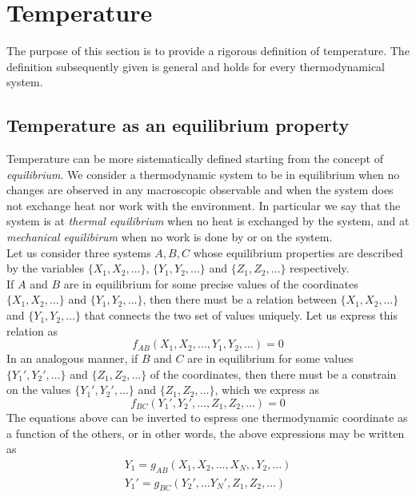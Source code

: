 \chapter{Temperature}

The purpose of this section is to provide a rigorous definition of temperature. The definition subsequently given is general and holds for every thermodynamical system.
\section{Temperature as an equilibrium property}
Temperature can be more sistematically defined starting from the concept of \emph{equilibrium}. We consider a thermodynamic system to be in equilibrium when 
no changes are observed in any macroscopic observable and when the system does not exchange heat nor work with the environment. In particular we say that the system is at \emph{thermal equilibrium} when no heat is exchanged by the system, and
at \emph{mechanical equilibirum} when no work is done by or on the system. \\
Let us consider three systems $A, B, C$ whose equilibrium properties are described by the variables
$\{X_1, X_2, \dots\}$, $\{Y_1, Y_2, \dots\}$ and $\{Z_1, Z_2, \dots\}$ respectively. \\
If $A$ and $B$ are in equilibrium for some precise values of the coordinates $\{X_1, X_2, \dots\}$ and $\{Y_1, Y_2, \dots\}$, then there must be a relation between $\{X_1, X_2, \dots\}$ and $\{Y_1, Y_2, \dots\}$ that connects the two set of values uniquely. Let us express this relation as
\begin{equation}
    f_{AB}(X_1, X_2, \dots, Y_1, Y_2, \dots) = 0
    \label{eq:constrain1}
\end{equation}
In an analogous manner, if $B$ and $C$ are in equilibrium for some values $\{Y_1', Y_2', \dots\}$ and $\{Z_1, Z_2, \dots\}$ of the coordinates, then there must be a constrain on the values $\{Y_1', Y_2', \dots\}$ and $\{Z_1, Z_2, \dots\}$, which we express as
\begin{equation}
    f_{BC}(Y_1', Y_2', \dots, Z_1, Z_2, \dots) = 0
    \label{eq:constrain2}
\end{equation}
The equations above can be inverted to espress one thermodynamic coordinate as a function of the others, or in other words, the above expressions may be written as
\begin{gather*}
    Y_1 = g_{AB} (X_1, X_2, \dots, X_N,, Y_2, \dots) \\
    Y_1' = g_{BC} (Y_2', \dots Y_N', Z_1, Z_2, \dots)
\end{gather*}
